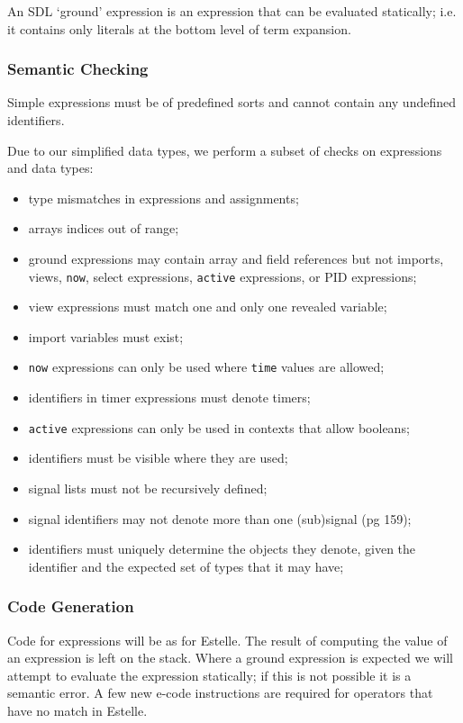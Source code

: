 An SDL `ground' expression is an expression that can be evaluated
statically; i.e. it contains only literals at the bottom level of
term expansion.

\subsubsection{Semantic Checking}

Simple expressions must be of predefined sorts and cannot contain any
undefined identifiers.

Due to our simplified data types, we perform a subset of checks on
expressions and data types:

\begin{itemize}
\item type mismatches in expressions and assignments;
\item arrays indices out of range;
\item ground expressions may contain array and field references
but not imports, views, {\tt now}, select expressions, {\tt active}
expressions, or PID expressions;
\item view expressions must match one and only one revealed variable;
\item import variables must exist;
\item {\tt now} expressions can only be used where {\tt time} values
are allowed;
\item identifiers in timer expressions must denote timers;
\item {\tt active} expressions can only be used in contexts that
allow booleans;
\item identifiers must be visible where they are used;
\item signal lists must not be recursively defined;
\item signal identifiers may not denote more than one (sub)signal (pg
159);
\item identifiers must uniquely determine the objects they denote,
given the identifier and the expected set of types that it may have;
\end{itemize}

\subsubsection{Code Generation}

Code for expressions will be as for Estelle. 
The result of computing the value of an expression is left on the stack.
Where a ground
expression is expected we will attempt to evaluate the expression
statically; if this is not possible it is a semantic error.
A few new e-code
instructions are required for operators that have no match in
Estelle.

